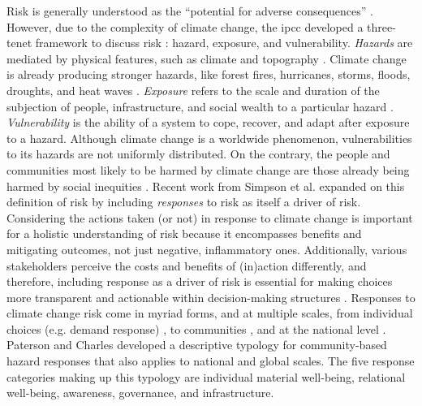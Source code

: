     Risk is generally understood as the ``potential for adverse consequences'' \cite{reisinger_concept_2020}. However, due to the complexity of climate change,
    the \ac{ipcc} developed a three-tenet framework to discuss risk \cite{reisinger_concept_2020}: hazard, exposure, and vulnerability. \textit{Hazards} are mediated by physical features, such as climate and topography \cite{dorkenoo_critical_2022, simpson_framework_2021}.  Climate change is already producing stronger hazards, like forest fires, hurricanes, storms, floods, droughts, and heat waves \cite{reidmiller_fourth_2018,
    intergovernmental_panel_on_climate_change_climate_2021, dahl_killer_2019}. 
    \textit{Exposure} refers to the scale and duration of the subjection of people, infrastructure, and social wealth to a particular hazard \cite{simpson_framework_2021,reisinger_concept_2020,li_understanding_2021}. \textit{Vulnerability} is the ability of a system to cope, recover, and adapt after exposure to a hazard. Although climate change is a worldwide phenomenon, vulnerabilities to its hazards are not uniformly distributed. On the contrary, the people and communities most likely to be harmed by climate change are those already being harmed by social inequities \cite{islam_climate_2017}. Recent work from Simpson et al. \cite{simpson_framework_2021} expanded on this definition of risk by including \textit{responses} to risk as itself a driver of risk. Considering the actions taken (or not) in response to climate change is important for a holistic understanding of risk because it encompasses benefits and mitigating outcomes, not just negative, inflammatory ones. Additionally, various stakeholders perceive the costs and benefits of (in)action differently, and therefore, including response as a driver of risk is essential for making choices more transparent and actionable within decision-making structures \cite{simpson_framework_2021}. Responses to climate change risk come in myriad forms,  and at multiple scales, from individual choices (e.g. demand response) \cite{seck_embedding_2020,rinaldi_what_2022, dehghanpour_agent-based_2018}, to communities \cite{paterson_community-based_2019, elmallah_frontlining_2022}, and at the national level \cite{roelfsema_taking_2020, fawzy_strategies_2020}. Paterson and Charles \cite{paterson_community-based_2019} developed a descriptive typology for community-based hazard responses that also applies to national and global scales. The five response categories making up this typology are individual material well-being, relational well-being, awareness, governance, and infrastructure.

